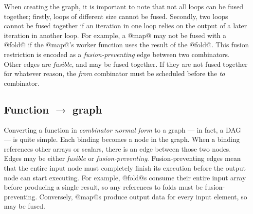 When creating the graph, it is important to note that not all loops can be fused together; firstly, loops of different size cannot be fused. Secondly, two loops cannot be fused together if an iteration in one loop relies on the output of a later iteration in another loop. For example, a @map@ may not be fused with a @fold@ if the @map@'s worker function uses the result of the @fold@.
This fusion restriction is encoded as a \emph{fusion-preventing} edge between two combinators. Other edges are \emph{fusible}, and may be fused together. If they are not fused together for whatever reason, the \emph{from} combinator must be scheduled before the \emph{to} combinator.



\subsection{Function $\to$ graph}


Converting a function in \emph{combinator normal form} to a graph --- in fact, a DAG --- is quite simple.
Each binding becomes a node in the graph. When a binding references other arrays or scalars, there is an edge between those two nodes. Edges may be either \emph{fusible} or \emph{fusion-preventing}. Fusion-preventing edges mean that the entire input node must completely finish its execution before the output node can start executing. For example, @fold@s consume their entire input array before producing a single result, so any references to folds must be fusion-preventing. Conversely, @map@s produce output data for every input element, so may be fused.

